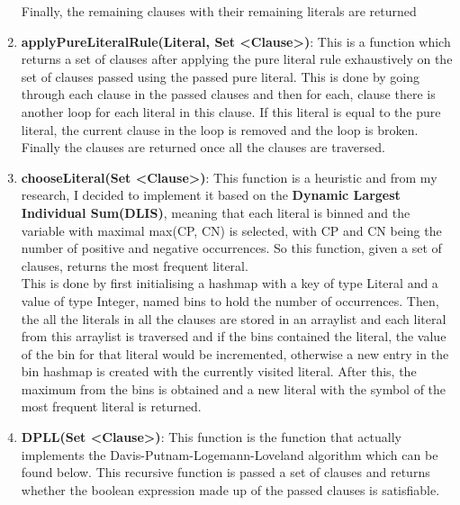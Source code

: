 \documentclass{article}
\begin{document}
\begin{enumerate}
\begin{itemize}
\begin{itemize}
					\end{itemize}
				
					
				\end{itemize}
				
		Finally, the remaining clauses with their remaining literals are returned
	
		\item \textbf{applyPureLiteralRule(Literal, Set \textless Clause\textgreater)}: This is a function which returns a set of clauses after applying the pure literal rule exhaustively on the set of clauses passed using the passed pure literal. This is done by going through each clause in the passed clauses and then for each, clause there is another loop for each literal in this clause. If this literal is equal to the pure literal, the current clause in the loop is removed and the loop is broken. Finally the clauses are returned once all the clauses are traversed.
						
		\item \textbf{chooseLiteral(Set \textless Clause\textgreater)}: This function is a heuristic and from my research, I decided to implement it based on the \textbf{Dynamic Largest Individual Sum(DLIS)}, meaning that each literal is binned and the variable with maximal max(CP, CN) is selected, with CP and CN being the number of positive and negative occurrences. So this function, given a set of clauses, returns the most frequent literal. \\
		
		This is done by first initialising a hashmap with a key of type Literal and a value of type Integer, named bins to hold the number of occurrences. Then, the all the literals in all the clauses are stored in an arraylist and each literal from this arraylist is traversed and if the bins contained the literal, the value of the bin for that literal would be incremented, otherwise a new entry in the bin hashmap is created with the currently visited literal. After this, the maximum from the bins is obtained and a new literal with the symbol of the most frequent literal is returned.
		
		\item \textbf{DPLL(Set \textless Clause\textgreater)}: This function is the function that actually implements the Davis-Putnam-Logemann-Loveland algorithm which can be found below. This recursive function is passed a set of clauses and returns whether the boolean expression made up of the passed clauses is satisfiable.
		

\end{enumerate}
\end{document}
